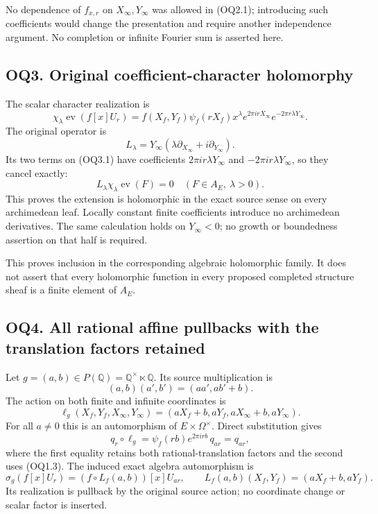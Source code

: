 No dependence of \(f_{x,r}\) on \(X_\infty,Y_\infty\) was allowed in
(OQ2.1); introducing such coefficients would change the presentation and
require another independence argument. No completion or infinite Fourier
sum is asserted here.

\subsection{OQ3. Original coefficient-character
holomorphy}\label{oq3.-original-coefficient-character-holomorphy}

The scalar character realization is \[
\chi_\lambda\operatorname{ev}(f[x]U_r)
=f(X_f,Y_f)\psi_f(rX_f)x^\lambda
e^{2\pi irX_\infty}e^{-2\pi r\lambda Y_\infty}.
\tag{OQ3.1}
\] The original operator is \[
L_\lambda
=Y_\infty(\lambda\partial_{X_\infty}+i\partial_{Y_\infty}).
\tag{OQ3.2}
\] Its two terms on (OQ3.1) have coefficients
\(2\pi ir\lambda Y_\infty\) and \(-2\pi ir\lambda Y_\infty\), so they
cancel exactly: \[
L_\lambda\chi_\lambda\operatorname{ev}(F)=0
\quad(F\in A_E,\ \lambda>0).
\tag{OQ3.3}
\] This proves the extension is holomorphic in the exact source sense on
every archimedean leaf. Locally constant finite coefficients introduce
no archimedean derivatives. The same calculation holds on
\(Y_\infty<0\); no growth or boundedness assertion on that half is
required.

This proves inclusion in the corresponding algebraic holomorphic family.
It does not assert that every holomorphic function in every proposed
completed structure sheaf is a finite element of \(A_E\).

\subsection{OQ4. All rational affine pullbacks with the translation
factors
retained}\label{oq4.-all-rational-affine-pullbacks-with-the-translation-factors-retained}

Let \(g=(a,b)\in P(\mathbb Q)=\mathbb Q^\times\ltimes\mathbb Q\). Its
source multiplication is \[
(a,b)(a',b')=(aa',ab'+b).
\] The action on both finite and infinite coordinates is \[
\ell_g(X_f,Y_f,X_\infty,Y_\infty)
=(aX_f+b,aY_f,aX_\infty+b,aY_\infty).
\tag{OQ4.1}
\] For all \(a\ne0\) this is an automorphism of
\(E\times\Omega^\times\). Direct substitution gives \[
q_r\circ\ell_g
=\psi_f(rb)e^{2\pi irb}\,q_{ar}
=q_{ar},
\tag{OQ4.2}
\] where the first equality retains both rational-translation factors
and the second uses (OQ1.3). The induced exact algebra automorphism is
\[
\boxed{\sigma_g(f[x]U_r)
=(f\circ L_f(a,b))[x]U_{ar},}
\qquad
L_f(a,b)(X_f,Y_f)=(aX_f+b,aY_f).
\tag{OQ4.3}
\] Its realization is pullback by the original source action; no
coordinate change or scalar factor is inserted.

